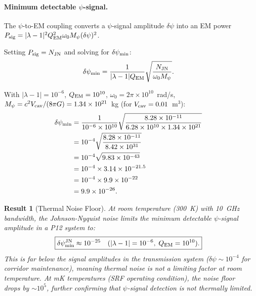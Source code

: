 \documentclass[aps,prd,twocolumn,superscriptaddress,nofootinbib]{revtex4-2}
\newtheorem{result}{Result}
\begin{document}
\paragraph{Minimum detectable $\psi$-signal.}
The $\psi$-to-EM coupling converts a $\psi$-signal amplitude $\delta\psi$ into
an EM power $P_{\rm sig} = |\lambda-1|^2 Q_{\rm EM}^2 \omega_0 M_\psi
(\delta\psi)^2$.

Setting $P_{\rm sig} = N_{\rm JN}$ and solving for $\delta\psi_{\rm min}$:
\begin{equation}
\delta\psi_{\rm min} = \frac{1}{|\lambda-1| Q_{\rm EM}}
\sqrt{\frac{N_{\rm JN}}{\omega_0 M_\psi}}.
\end{equation}

With $|\lambda-1| = 10^{-6}$, $Q_{\rm EM} = 10^{10}$,
$\omega_0 = 2\pi\times10^{10}$~rad/s,
$M_\psi = c^2 V_{\rm cav}/(8\pi G) = 1.34\times10^{21}$~kg
(for $V_{\rm cav} = 0.01$~m$^3$):
\begin{align}
\delta\psi_{\rm min}
&= \frac{1}{10^{-6}\times10^{10}}
\sqrt{\frac{8.28\times10^{-11}}{6.28\times10^{10}\times1.34\times10^{21}}} \notag\\
&= 10^{-4}
\sqrt{\frac{8.28\times10^{-11}}{8.42\times10^{31}}} \notag\\
&= 10^{-4}\sqrt{9.83\times10^{-43}} \notag\\
&= 10^{-4}\times3.14\times10^{-21.5} \notag\\
&= 10^{-4}\times9.9\times10^{-22} \notag\\
&= 9.9\times10^{-26}.
\end{align}

\begin{result}[Thermal Noise Floor]
At room temperature (300~K) with 10~GHz bandwidth, the Johnson-Nyquist noise
limits the minimum detectable $\psi$-signal amplitude in a P12 system to:
\begin{equation}
\boxed{
\delta\psi_{\rm min}^{\rm JN} \approx 10^{-25}
\quad(|\lambda-1| = 10^{-6},\;Q_{\rm EM} = 10^{10}).
}
\end{equation}
This is far below the signal amplitudes in the transmission system
($\delta\psi \sim 10^{-4}$ for corridor maintenance), meaning thermal noise
is not a limiting factor at room temperature.  At mK temperatures (SRF
operating condition), the noise floor drops by $\sim 10^5$, further
confirming that $\psi$-signal detection is not thermally limited.
\end{result}

\end{document}
